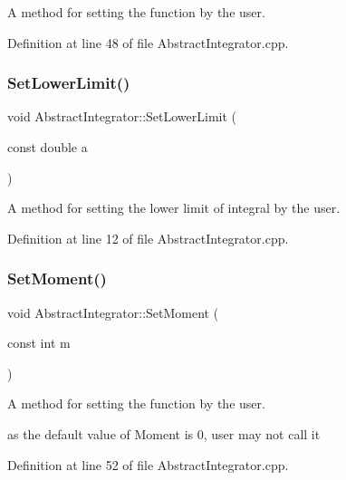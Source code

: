 A method for setting the function by the user. 



Definition at line 48 of file Abstract\+Integrator.\+cpp.

\mbox{\label{class_abstract_integrator_aea1949bda48ee6f4501475e8da26aaeb}} 
\subsubsection{\texorpdfstring{Set\+Lower\+Limit()}{SetLowerLimit()}}
{\footnotesize\ttfamily void Abstract\+Integrator\+::\+Set\+Lower\+Limit (\begin{DoxyParamCaption}\item[{const double}]{a }\end{DoxyParamCaption})}



A method for setting the lower limit of integral by the user. 



Definition at line 12 of file Abstract\+Integrator.\+cpp.

\mbox{\label{class_abstract_integrator_a871fa27363ee09b98c964ccaa33da100}} 
\subsubsection{\texorpdfstring{Set\+Moment()}{SetMoment()}}
{\footnotesize\ttfamily void Abstract\+Integrator\+::\+Set\+Moment (\begin{DoxyParamCaption}\item[{const int}]{m }\end{DoxyParamCaption})}



A method for setting the function by the user. 

as the default value of Moment is 0, user may not call it 

Definition at line 52 of file Abstract\+Integrator.\+cpp.

\mbox{\label{class_abstract_integrator_a48c0b007c4b18e4a229f014bb0ccf9c0}} 
